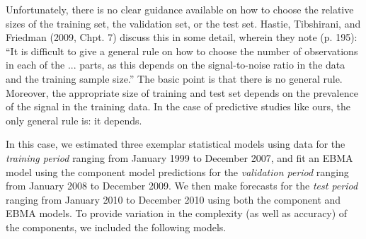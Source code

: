 Unfortunately, there is no clear guidance available on how to choose
the relative sizes of the training set, the validation set, or the
test set.  Hastie, Tibshirani, and Friedman (2009, Chpt. 7) discuss
this in some detail, wherein they note (p. 195): ``It is difficult to
give a general rule on how to choose the number of observations in
each of the ... parts, as this depends on the signal-to-noise ratio in
the data and the training sample size.''  The basic point is that there is
no general rule. Moreover, the appropriate size of training and test set
depends on the prevalence of the signal in the training data. In the
case of predictive studies like ours, the only general rule is: it
depends.  %

In this case, we estimated three exemplar statistical models using
data for the \textit{training period} ranging from January
1999 to
December 2007, and fit an EBMA model using the component model
predictions for the \textit{validation period} ranging from January
2008 to December 2009.  We then make forecasts for the \textit{test
  period} ranging from January 2010 to December 2010 using both the
component and EBMA models.  To provide variation in the complexity (as
well as accuracy) of the components, we included the following models.


